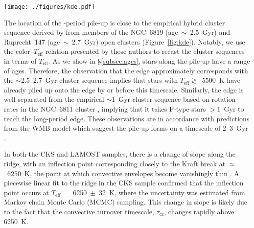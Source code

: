 \documentclass[linenumbers,trackchanges,twocolumn]{aastex631}
\newcommand{\taucz}{$\tau_\mathrm{cz}$\xspace}
\newcommand{\lamostmcq}{LAMOST--McQuillan\xspace}
\newcommand{\teffmin}{5500~K\xspace}
\newcommand{\teff}{\ensuremath{T_{\mathrm{eff}}}\xspace}
\newcommand{\prot}{\ensuremath{P_\mathrm{rot}}\xspace}
\begin{document}
\begin{figure*}
    \centering
    \texttt{[image: ./figures/kde.pdf]}
    \caption{Gaussian kernel density estimation (blue contours) of the \teff--\prot distributions of the CKS--McQuillan, \lamostmcq, and asteroseismic \citet{Hall2021} samples, from left to right. Empirical cluster sequences from \citet{Curtis2020} are shown by the dark grey lines. The orange dashed lines show constant Rossby curves of fiducial values (see \S\ref{subsec:rossby}). The short-period pile-up can be observed in the LAMOST--McQuillan sample for \teff~$\gtrsim$~5500~K. The orange point indicates the Sun's temperature and equatorial rotation period, with the errorbar capturing the range of periods measured from its differentially rotating surface.}
    \label{fig:kde}
\end{figure*}

The location of the -period pile-up is close to the empirical hybrid cluster sequence derived by \citet{Curtis2020} from members of the NGC~6819 (age~$\sim$~2.5~Gyr) and Ruprecht~147 (age~$\sim$~2.7~Gyr) open clusters (Figure~\ref{fig:kde}). Notably, we use the color--\teff relation presented by those authors to recast the cluster sequences in terms of \teff. As we show in \S\ref{subsec:ages}, stars along the pile-up have a range of ages. Therefore, the observation that the edge approximately corresponds with the $\sim$2.5--2.7~Gyr cluster sequence implies that stars with \teff$\gtrsim$~\teffmin have already piled up onto the edge by or before this timescale. Similarly, the edge is well-separated from the empirical $\sim$1~Gyr cluster sequence based on rotation rates in the NGC~6811 cluster \citep{Curtis2019a, Curtis2020}, implying that it takes F-type stars $>1$~Gyr to reach the long-period edge. These observations are in accordance with predictions from the WMB model which suggest the pile-up forms on a timescale of 2--3~Gyr \citep{vanSaders2019}.

In both the CKS and LAMOST samples, there is a change of slope along the ridge, with an inflection point corresponding closely to the Kraft break at $\approx$~6250~K, the point at which convective envelopes become vanishingly thin \citep{Kraft1967}. A piecewise linear fit to the ridge in the CKS sample confirmed that the inflection point occurs at \teff~=~6250~$\pm$~32~K, where the uncertainty was estimated from Markov chain Monte Carlo (MCMC) sampling. This change in slope is likely due to the fact that the convective turnover timescale, \taucz, changes rapidly above 6250~K.
\end{document}
